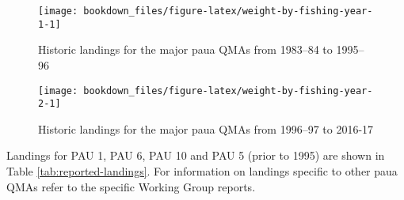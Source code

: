 \documentclass{mpi-plenary}
\theoremstyle{definition}
\theoremstyle{definition}
\theoremstyle{definition}
\theoremstyle{remark}
\begin{document}
\begin{figure}

{\centering \texttt{[image: bookdown\_files/figure-latex/weight-by-fishing-year-1-1]} 

}

\caption{Historic landings for the major paua QMAs from 1983–84 to 1995–96}\label{fig:weight-by-fishing-year-1}
\end{figure}

\begin{figure}

{\centering \texttt{[image: bookdown\_files/figure-latex/weight-by-fishing-year-2-1]} 

}

\caption{Historic landings for the major paua QMAs from 1996–97 to 2016-17}\label{fig:weight-by-fishing-year-2}
\end{figure}

Landings for PAU 1, PAU 6, PAU 10 and PAU 5 (prior to 1995) are shown in
Table \ref{tab:reported-landings}. For information on landings specific
to other paua QMAs refer to the specific Working Group reports.
\end{document}
